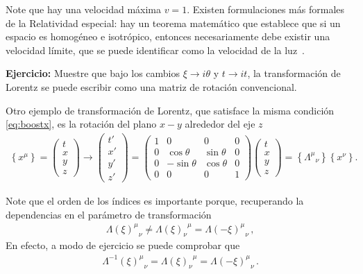 Note que hay una velocidad máxima $v=1$.  Existen formulaciones más formales de la Relatividad especial: hay un teorema matemático que establece que si un espacio es homogéneo e isotrópico, entonces necesariamente debe existir una velocidad límite, que se puede identificar como la velocidad de la luz~\cite{drory2016function}. 

\textbf{Ejercicio:} Muestre que bajo los cambios $\xi\to i\theta$ y $t\to it$, la transformación de Lorentz se puede escribir como una matriz de rotación convencional.

Otro ejemplo de transformación de Lorentz, que satisface la misma condición \eqref{eq:boostx}, es la rotación del plano $x-y$ alrededor del eje $z$
\begin{align}
    \left\{x^\mu\right\}=\begin{pmatrix}
    t\\
    x\\
    y\\
    z
  \end{pmatrix}\to
  \begin{pmatrix}
    t'\\
    x'\\
    y'\\
    z'
  \end{pmatrix}= 
  \begin{pmatrix}
    1     &0&0&0\\
    0     &\cos\theta&\sin\theta&0\\
    0     & -\sin\theta  &\cos\theta&0\\
    0     &  0  &0&1
  \end{pmatrix}
  \begin{pmatrix}
    t\\
    x\\
    y\\
    z
  \end{pmatrix}
=\left\{{\Lambda^\mu}_{\nu}\right\}\left\{x^\nu\right\}.
\end{align}

Note que el orden de los índices es importante porque, recuperando la dependencias en el parámetro de transformación
\begin{align}
  {\Lambda(\xi)^{\mu}}_{\nu}\ne {\Lambda(\xi)_{\nu}}^{\mu}={\Lambda(-\xi)^{\mu}}_{\nu}\,,
\end{align}
En efecto, a modo de ejercicio se puede comprobar que
\begin{align}
{\Lambda^{-1}(\xi)^{\mu}}_{\nu} ={\Lambda(\xi)_{\nu}}^{\mu}= {\Lambda(-\xi)^{\mu}}_{\nu}\,.
\end{align}


